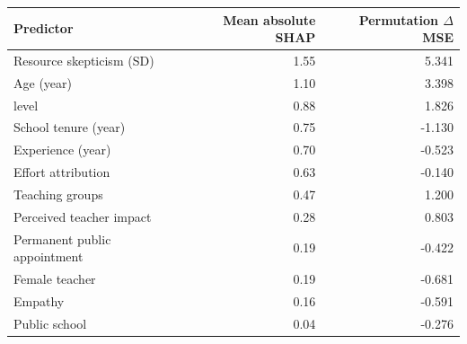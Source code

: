 \begin{tabular}{@{}p{6cm}rr@{}}
\toprule
Predictor & Mean absolute SHAP & Permutation $\Delta$ MSE \\
\midrule
Resource skepticism (SD) & 1.55 & 5.341 \\
Age (year) & 1.10 & 3.398 \\
level & 0.88 & 1.826 \\
School tenure (year) & 0.75 & -1.130 \\
Experience (year) & 0.70 & -0.523 \\
Effort attribution & 0.63 & -0.140 \\
Teaching groups & 0.47 & 1.200 \\
Perceived teacher impact & 0.28 & 0.803 \\
Permanent public appointment & 0.19 & -0.422 \\
Female teacher & 0.19 & -0.681 \\
Empathy & 0.16 & -0.591 \\
Public school & 0.04 & -0.276 \\
\bottomrule
\end{tabular}
